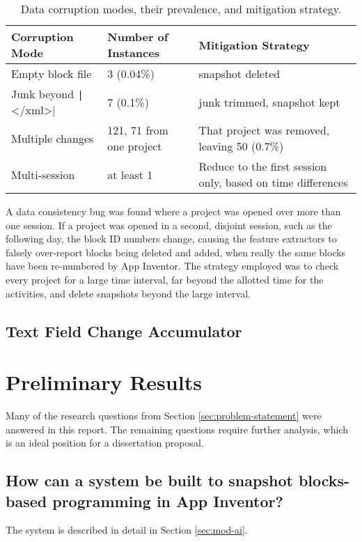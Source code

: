 \begin{table}
\begin{centering}
	\begin{tabular}{l l p{5.4cm}}
	Corruption Mode & Number of Instances & Mitigation Strategy \\ \hline
	Empty block file & 3 (0.04\%) & snapshot deleted \\
	Junk beyond \texttt|</xml>| & 7 (0.1\%) & junk trimmed, snapshot kept \\
	Multiple changes & 121, 71 from one project & That project was removed, leaving 50 (0.7\%) \\
	Multi-session & at least 1 & Reduce to the first session only, based on time differences %
	\end{tabular}
	\caption[Data corruption modes]{Data corruption modes, their prevalence, and mitigation strategy.}
	\label{tab:data-corruption}
\end{centering}
\end{table}

A data consistency bug was found where a project was opened over more than one session. If a project was opened in a second, disjoint session, such as the following day, the block ID numbers change, causing the feature extractors to falsely over-report blocks being deleted and added, when really the same blocks have been re-numbered by App Inventor. The strategy employed was to check every project for a large time interval, far beyond the allotted time for the activities, and delete snapshots beyond the large interval. %

\section{Text Field Change Accumulator}
\label{sec:text-acc}

\chapter{Preliminary Results} %


Many of the research questions from Section \ref{sec:problem-statement} were answered in this report. The remaining questions require further analysis, which is an ideal position for a dissertation proposal. 

\section{How can a system be built to snapshot blocks-based programming in App Inventor? }
The system is described in detail in Section \ref{sec:mod-ai}.

